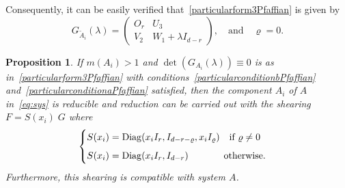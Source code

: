 \documentclass[final,1p,times,number,amsthm]{elsart}
\newtheorem{proposition}[lemma]{Proposition}
\begin{document}
Consequently, it can be easily verified that~\eqref{particularform3Pfaffian} is
given by
$$
G_{\tilde{A}_{i}} (\lambda) = \left(\begin{matrix} O_r & U_3 \\[5pt] V_2 & W_1 +
    \lambda I_{d- r} \end{matrix}\right) , \quad \text{and} \quad \varrho = 0
. $$
\begin{proposition}
\label{shearingPfaffian}
If $m(A_{i}) >1$ and $\det(G_{A_{i}} (\lambda)) \equiv 0$ is as
in~\eqref{particularform3Pfaffian} with
conditions~\eqref{particularconditionbPfaffian}
and~\eqref{particularconditionaPfaffian} satisfied, then the component $A_{i}$
of $A$ in~\eqref{eq:sys} is reducible and reduction can be carried out with the
shearing $F = S(x_i)\;G$ where
 $$\begin{cases} S(x_i)=\operatorname{Diag}(x_i I_r , I_{d-r-\varrho}, x_i
   I_\varrho) \quad \text{if } \varrho \neq 0 \\[5pt]
   S(x_i)=\operatorname{Diag}(x_i I_r , I_{d-r}) \hspace{37px}
   \text{otherwise.} \end{cases} $$
 Furthermore, this shearing is compatible with system $A$.
\end{proposition}
\end{document}
